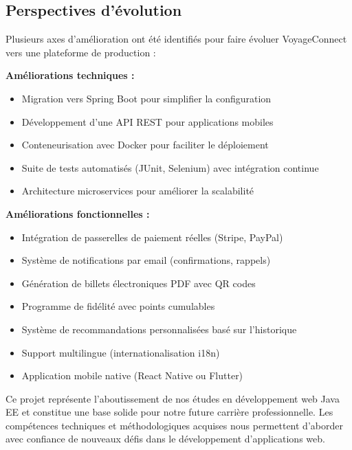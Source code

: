 \documentclass[12pt,a4paper]{report}
\begin{document}
\subsection*{Perspectives d'évolution}

Plusieurs axes d'amélioration ont été identifiés pour faire évoluer VoyageConnect vers une plateforme de production :

\textbf{Améliorations techniques :}
\begin{itemize}
    \item Migration vers Spring Boot pour simplifier la configuration
    \item Développement d'une API REST pour applications mobiles
    \item Conteneurisation avec Docker pour faciliter le déploiement
    \item Suite de tests automatisés (JUnit, Selenium) avec intégration continue
    \item Architecture microservices pour améliorer la scalabilité
\end{itemize}

\textbf{Améliorations fonctionnelles :}
\begin{itemize}
    \item Intégration de passerelles de paiement réelles (Stripe, PayPal)
    \item Système de notifications par email (confirmations, rappels)
    \item Génération de billets électroniques PDF avec QR codes
    \item Programme de fidélité avec points cumulables
    \item Système de recommandations personnalisées basé sur l'historique
    \item Support multilingue (internationalisation i18n)
    \item Application mobile native (React Native ou Flutter)
\end{itemize}

\vspace{0.5cm}

\noindent
Ce projet représente l'aboutissement de nos études en développement web Java EE et constitue une base solide pour notre future carrière professionnelle. Les compétences techniques et méthodologiques acquises nous permettent d'aborder avec confiance de nouveaux défis dans le développement d'applications web.

\clearpage

\end{document}

